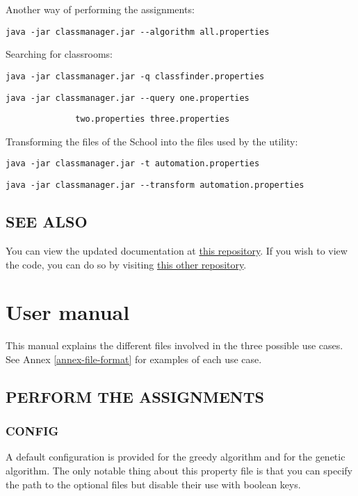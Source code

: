 Another way of performing the assignments:

\verb|java -jar classmanager.jar --algorithm all.properties|

Searching for classrooms:

\verb|java -jar classmanager.jar -q classfinder.properties|

\verb|java -jar classmanager.jar --query one.properties|

\verb|              two.properties three.properties|

Transforming the files of the School into the files used by the utility:

\verb|java -jar classmanager.jar -t automation.properties|

\verb|java -jar classmanager.jar --transform automation.properties|



\subsection*{SEE ALSO}

You can view the updated documentation at \href{https://github.com/fonsecadh/classroom-manager-doc}{this repository}. If you wish to view the code, you can do so by visiting \href{https://github.com/fonsecadh/classroom-manager-code}{this other repository}.



\section{User manual}

This manual explains the different files involved in the three possible use cases. See Annex \ref{annex-file-format} for examples of each use case.


\subsection*{PERFORM THE ASSIGNMENTS}


\subsubsection*{CONFIG}

A default configuration is provided for the greedy algorithm and for the genetic algorithm. The only notable thing about this property file is that you can specify the path to the optional files but disable their use with boolean keys.

